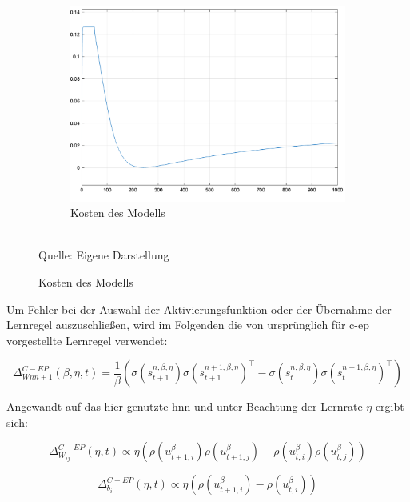 \begin{figure}[h]
\begin{subfigure}[b]{0.3\textwidth}
    \includegraphics[width=\textwidth]{abbildungen/c_ep_convergence_kosten.png}
    \caption{Kosten des Modells}
  \end{subfigure}
  \\
  Quelle: Eigene Darstellung
\end{figure}

Um Fehler bei der Auswahl der Aktivierungsfunktion oder der Übernahme der Lernregel auszuschließen, wird im Folgenden die von \citeauthor{Ernoult2020} ursprünglich für \ac{c-ep} vorgestellte Lernregel verwendet:

\[\Delta^{C-EP}_{Wnn+1}(\beta,\eta,t)=\frac{1}{\beta}\left(\sigma\left(s^{n,\beta,\eta}_{t+1}\right)\sigma\left(s^{n+1,\beta,\eta}_{t+1}\right)^\intercal-\sigma\left(s^{n,\beta,\eta}_{t}\right)\sigma\left(s^{n+1,\beta,\eta}_{t}\right)^\intercal\right)\]

Angewandt auf das hier genutzte \ac{hnn} und unter Beachtung der Lernrate \(\eta\) ergibt sich:

\[\Delta^{C-EP}_{W_{ij}}(\eta,t)\propto\eta\left(\rho(u^{\beta}_{t+1,i})\rho(u^{\beta}_{t+1,j})-\rho(u^{\beta}_{t,i})\rho(u^{\beta}_{t,j})\right)\]

\[\Delta^{C-EP}_{b_{i}}(\eta,t)\propto\eta\left(\rho(u^{\beta}_{t+1,i})-\rho(u^{\beta}_{t,i})\right)\]

